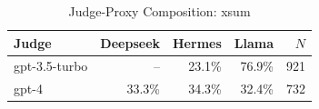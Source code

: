 \begin{table}[htbp]
\centering
\caption{Judge-Proxy Composition: xsum}
\label{tab:composition_xsum}
\begin{tabular}{lrrrr}
\toprule
Judge & Deepseek & Hermes & Llama & $N$ \\
\midrule
gpt-3.5-turbo & -- & 23.1\% & 76.9\% & 921 \\
gpt-4 & 33.3\% & 34.3\% & 32.4\% & 732 \\
\bottomrule
\end{tabular}
\end{table}
